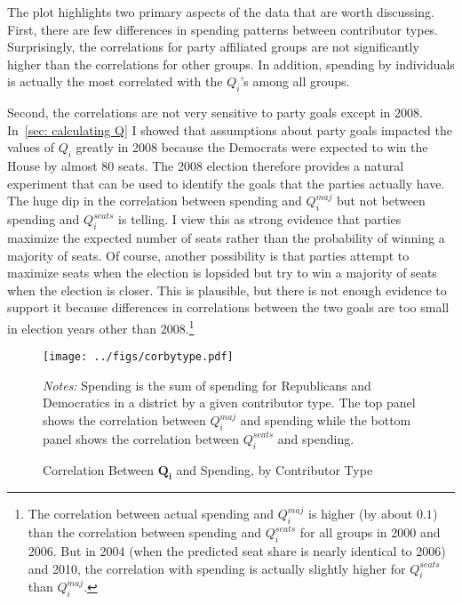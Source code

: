 \documentclass[12pt,final,fleqn]{article}
\theoremstyle{plain}
\begin{document}
The plot highlights two primary aspects of the data that are worth discussing. First, there are few differences in spending patterns between contributor types. Surprisingly, the correlations for party affiliated groups are not significantly higher than the correlations for other groups. In addition, spending by individuals is actually the most correlated with the $Q_i$'s among all groups. 

Second, the correlations are not very sensitive to party goals except in 2008. In~\autoref{sec: calculating Q} I showed that assumptions about party goals impacted the values of $Q_i$ greatly in 2008 because the Democrats were expected to win the House by almost 80 seats. The 2008 election therefore provides a natural experiment that can be used to identify the goals that the parties actually have. The huge dip in the correlation between spending and $Q_i^{maj}$ but not between spending and  $Q_i^{seats}$ is telling. I view this as strong evidence that parties maximize the expected number of seats rather than the probability of winning a majority of seats. Of course, another possibility is that parties attempt to maximize seats when the election is lopsided but try to win a majority of seats when the election is closer. This is plausible, but there is not enough evidence to support it because differences in correlations between the two goals are too small in election years other than 2008.\footnote{The correlation between actual spending and $Q_i^{maj}$ is higher (by about $0.1$) than the correlation between spending and $Q_i^{seats}$ for all groups in 2000 and 2006. But in 2004 (when the predicted seat share is nearly identical to 2006) and 2010, the correlation with spending is actually slightly higher for $Q_i^{seats}$ than $Q_i^{maj}$.}

\begin{figure}[!htb]
\texttt{[image: ../figs/corbytype.pdf]}
\vspace{.5cm}
\caption{Correlation Between $\mathbf{Q_i}$ and Spending, by Contributor Type}
\label{fig:Correlation Between Q and Spending, by Contributor Type}
\begin{minipage}{\linewidth}
\footnotesize
\emph{Notes:} Spending is the sum of spending for Republicans and Democratics in a district by a given contributor type. The top panel shows the correlation between $Q_i^{maj}$ and spending while the bottom panel shows the correlation between $Q_i^{seats}$ and spending.
\end{minipage}
\end{figure}
\end{document}
